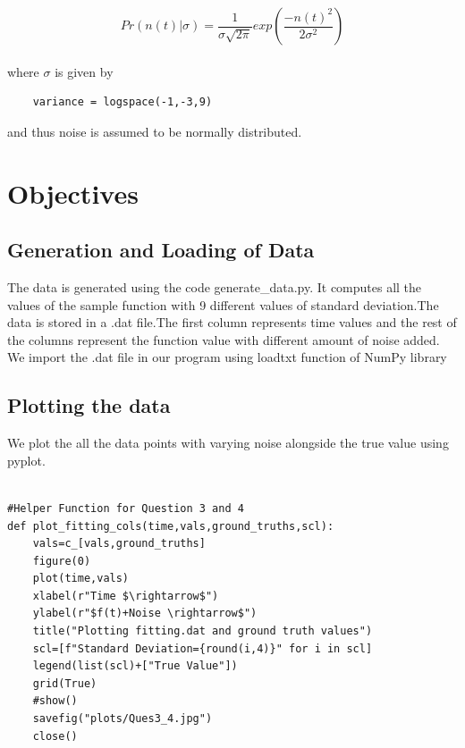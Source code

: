\documentclass[11pt, a4paper]{article}
\begin{document}
 \begin{equation*}
Pr(n(t)|\sigma) = \frac{1}{\sigma\sqrt{2\pi}}exp(\frac{-n(t)^2}{2\sigma^2})
\end{equation*}
\\where $\sigma$ is given by 
\begin{verbatim}
    variance = logspace(-1,-3,9)
\end{verbatim}
and thus noise is assumed to be normally distributed.\\


\section{Objectives}
\subsection{Generation and Loading of Data}
\par The data is generated using the code generate\_data.py. It computes all the values of the sample function with 9 different values of standard deviation.The data is stored in a .dat file.The first column represents time values and the rest of the columns represent the function value with different amount of noise added. We import the .dat file in our program using loadtxt function of NumPy library\\

\subsection{Plotting the data}
\par We plot the all the data points with varying noise alongside the true value using pyplot.

\begin{lstlisting}

#Helper Function for Question 3 and 4
def plot_fitting_cols(time,vals,ground_truths,scl):
    vals=c_[vals,ground_truths]
    figure(0)
    plot(time,vals)
    xlabel(r"Time $\rightarrow$")
    ylabel(r"$f(t)+Noise \rightarrow$")
    title("Plotting fitting.dat and ground truth values")
    scl=[f"Standard Deviation={round(i,4)}" for i in scl]
    legend(list(scl)+["True Value"])
    grid(True)
    #show()
    savefig("plots/Ques3_4.jpg")
    close()
    
\end{lstlisting}
\end{document}
